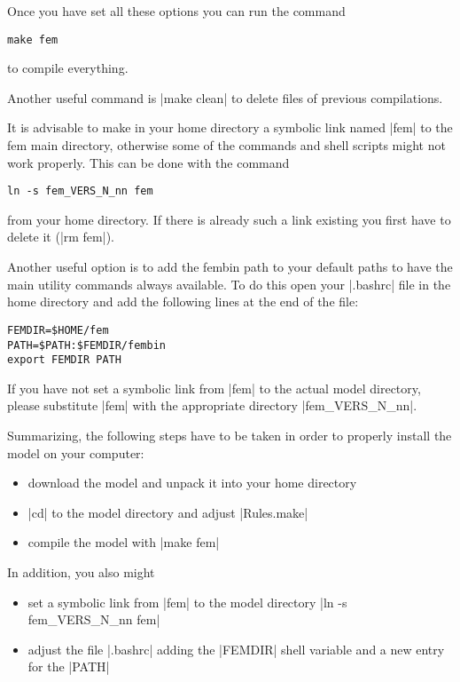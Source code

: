 Once you have set all these options you can run the command

\begin{citation}
\verb|make fem|
\end{citation}

to compile everything.

Another useful command is |make clean| to delete files of previous compilations.

It is advisable to make in your home directory a symbolic link named |fem|
to the fem main directory, otherwise some of the commands and shell scripts
might not work properly. This can be done with the command

\begin{citation}
\verb|ln -s fem_VERS_N_nn fem|
\end{citation}

from your home directory. If there is already such a link existing you first
have to delete it (|rm fem|).

Another useful option is to add the fembin path to your default paths
to have the main utility commands always available. To do this
open your |.bashrc| file in the home directory
and add the following lines at the end of the file:

\begin{verbatim}
FEMDIR=$HOME/fem
PATH=$PATH:$FEMDIR/fembin
export FEMDIR PATH
\end{verbatim}

If you have not set a symbolic link from |fem| to the actual model directory,
please substitute |fem| with the appropriate directory |fem_VERS_N_nn|.

Summarizing, the following steps have to be taken in order to
properly install the model on your computer:
\begin{itemize}
\item download the model and unpack it into your home directory
\item |cd| to the model directory and adjust |Rules.make|
\item compile the model with |make fem|
\end{itemize}

In addition, you also might
\begin{itemize}
\item set a symbolic link from |fem| to the model directory
		|ln -s fem_VERS_N_nn fem|
\item adjust the file |.bashrc| adding the |FEMDIR| shell variable 
	and a new entry for the |PATH|
\end{itemize}
